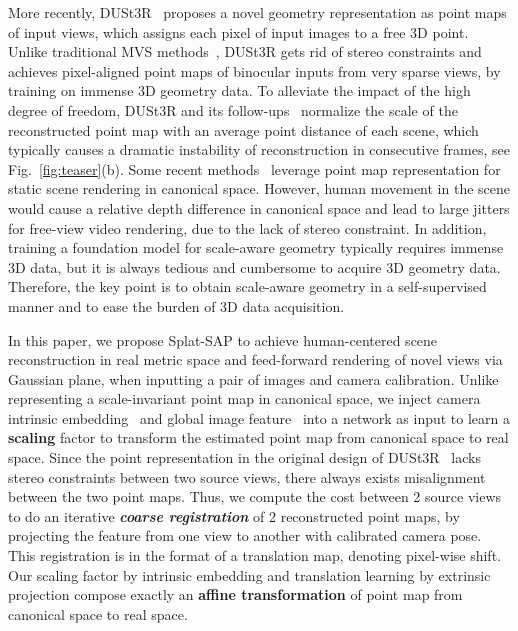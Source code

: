 More recently, DUSt3R~\cite{wang2024dust3r, leroy2024grounding} proposes a novel geometry representation as point maps of input views, which assigns each pixel of input images to a free 3D point.
%
Unlike traditional MVS methods~\cite{yao2018mvsnet, yang2020cost}, DUSt3R gets rid of stereo constraints and achieves pixel-aligned point maps of binocular inputs from very sparse views, by training on immense 3D geometry data.
%
To alleviate the impact of the high degree of freedom, DUSt3R and its follow-ups~\cite{leroy2024grounding, wang2024moge} normalize the scale of the reconstructed point map with an average point distance of each scene, which typically causes a dramatic instability of reconstruction in consecutive frames, see Fig.~\ref{fig:teaser}(b). 
%
Some recent methods~\cite{smart2024splatt3r, ye2024nopose} leverage point map representation for static scene rendering in canonical space.
However, human movement in the scene would cause a relative depth difference in canonical space and lead to large jitters for free-view video rendering, due to the lack of stereo constraint.
%
In addition, training a foundation model for scale-aware geometry typically requires immense 3D data, but it is always tedious and cumbersome to acquire 3D geometry data.
%
Therefore, the key point is to obtain scale-aware geometry in a self-supervised manner and to ease the burden of 3D data acquisition.


In this paper, we propose Splat-SAP to achieve human-centered scene reconstruction in real metric space and feed-forward rendering of novel views via Gaussian plane, when inputting a pair of images and camera calibration.
%
Unlike \cite{wang2024dust3r, leroy2024grounding} representing a scale-invariant point map in canonical space, we inject camera intrinsic embedding~\cite{ye2024nopose} and global image feature~\cite{wang2025vggt} into a network as input to learn a \textbf{scaling} factor to transform the estimated point map from canonical space to real space.
%
Since the point representation in the original design of DUSt3R~\cite{wang2024dust3r, leroy2024grounding} lacks stereo constraints between two source views, there always exists misalignment between the two point maps.
%
Thus, we compute the cost between 2 source views to do an iterative \textbf{\textit{coarse registration}} of 2 reconstructed point maps, by projecting the feature from one view to another with calibrated camera pose.
%
This registration is in the format of a translation map, denoting pixel-wise shift.
%
Our scaling factor by intrinsic embedding and translation learning by extrinsic projection compose exactly an \textbf{affine transformation} of point map from canonical space to real space.


